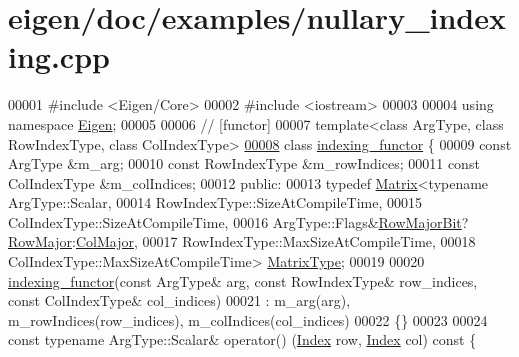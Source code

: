 \hypertarget{eigen_2doc_2examples_2nullary__indexing_8cpp_source}{}\section{eigen/doc/examples/nullary\+\_\+indexing.cpp}
\label{eigen_2doc_2examples_2nullary__indexing_8cpp_source}

\begin{DoxyCode}
00001 \textcolor{preprocessor}{#include <Eigen/Core>}
00002 \textcolor{preprocessor}{#include <iostream>}
00003 
00004 \textcolor{keyword}{using namespace }\hyperlink{namespace_eigen}{Eigen};
00005 
00006 \textcolor{comment}{// [functor]}
00007 \textcolor{keyword}{template}<\textcolor{keyword}{class} ArgType, \textcolor{keyword}{class} RowIndexType, \textcolor{keyword}{class} ColIndexType>
\hyperlink{classindexing__functor}{00008} \textcolor{keyword}{class }\hyperlink{classindexing__functor}{indexing\_functor} \{
00009   \textcolor{keyword}{const} ArgType &m\_arg;
00010   \textcolor{keyword}{const} RowIndexType &m\_rowIndices;
00011   \textcolor{keyword}{const} ColIndexType &m\_colIndices;
00012 \textcolor{keyword}{public}:
00013   \textcolor{keyword}{typedef} \hyperlink{group___core___module_class_eigen_1_1_matrix}{Matrix}<\textcolor{keyword}{typename} ArgType::Scalar,
00014                  RowIndexType::SizeAtCompileTime,
00015                  ColIndexType::SizeAtCompileTime,
00016                  ArgType::Flags&\hyperlink{group__flags_gae4f56c2a60bbe4bd2e44c5b19cbe8762}{RowMajorBit}?\hyperlink{group__enums_ggaacded1a18ae58b0f554751f6cdf9eb13acfcde9cd8677c5f7caf6bd603666aae3}{RowMajor}:\hyperlink{group__enums_ggaacded1a18ae58b0f554751f6cdf9eb13a0cbd4bdd0abcfc0224c5fcb5e4f6669a}{ColMajor},
00017                  RowIndexType::MaxSizeAtCompileTime,
00018                  ColIndexType::MaxSizeAtCompileTime> \hyperlink{group___core___module_class_eigen_1_1_matrix}{MatrixType};
00019 
00020   \hyperlink{classindexing__functor}{indexing\_functor}(\textcolor{keyword}{const} ArgType& arg, \textcolor{keyword}{const} RowIndexType& row\_indices, \textcolor{keyword}{const} ColIndexType&
       col\_indices)
00021     : m\_arg(arg), m\_rowIndices(row\_indices), m\_colIndices(col\_indices)
00022   \{\}
00023 
00024   \textcolor{keyword}{const} \textcolor{keyword}{typename} ArgType::Scalar& operator() (\hyperlink{namespace_eigen_a62e77e0933482dafde8fe197d9a2cfde}{Index} row, \hyperlink{namespace_eigen_a62e77e0933482dafde8fe197d9a2cfde}{Index} col)\textcolor{keyword}{ const }\{

\end{DoxyCode}
